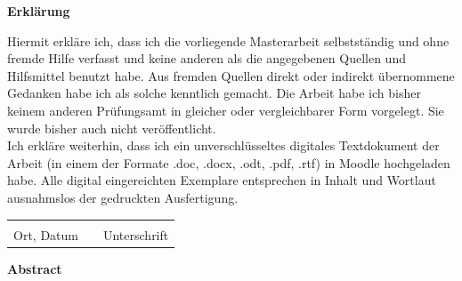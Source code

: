 \documentclass[a4paper,oneside,12pt]{report}
\begin{document}
\vspace*{5cm} 
\begin{center}
    \textbf{Erklärung}
\end{center}

Hiermit erkläre ich, dass ich die vorliegende Masterarbeit selbstständig und ohne fremde Hilfe verfasst und keine anderen als die angegebenen Quellen und Hilfsmittel benutzt habe. Aus fremden Quellen direkt oder indirekt übernommene Gedanken habe ich als solche kenntlich gemacht. Die Arbeit habe ich bisher keinem anderen Prüfungsamt in gleicher oder vergleichbarer Form vorgelegt. Sie wurde bisher auch nicht veröffentlicht.\\[1cm]
Ich erkläre weiterhin, dass ich ein unverschlüsseltes digitales Textdokument der Arbeit (in einem der Formate .doc, .docx, .odt, .pdf, .rtf) in Moodle hochgeladen habe. Alle digital eingereichten Exemplare entsprechen in Inhalt und Wortlaut ausnahmslos der gedruckten Ausfertigung.\\[2cm]
\begin{tabular}{ p{5cm}p{1cm}p{5cm} }
    \hrulefill & & \hrulefill\\
    Ort, Datum & & Unterschrift
\end{tabular}

\newpage

\vspace*{3cm} 
\begin{center}
    \textbf{Abstract}
\end{center}

\varabstract

\newpage

\tableofcontents

\newpage
{}



\clearpage
	
\end{document}
